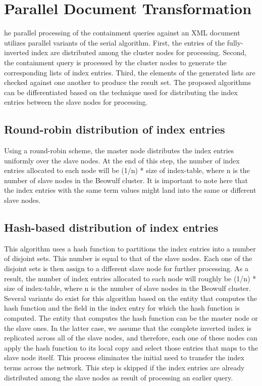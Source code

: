 \section{Parallel Document Transformation}
he parallel processing of the containment queries against an XML document utilizes parallel variants of the serial algorithm. First, the entries of the fully-inverted index are distributed among the cluster nodes for processing. Second, the containment query is processed by the cluster nodes to generate the corresponding lists of index entries. Third, the elements of the generated lists are checked against one another to produce the result set. The proposed algorithms can be differentiated based on the technique used for distributing the index entries between the slave nodes for processing.
\subsection{Round-robin distribution of index entries}
Using a round-robin scheme, the master node distributes the index entries uniformly over the slave nodes. At the end of this step, the number of index entries allocated to each node will be (1/n) * size of index-table, where n is the number of slave nodes in the Beowulf cluster. It is important to note here that the index entries with the same term values might land 
into the same or different slave nodes.
\subsection{Hash-based distribution of index entries}
This algorithm uses a hash function to partitions the index entries into a number of disjoint sets. This number is equal to that of the slave nodes. Each one of the disjoint sets is then assign to a different slave node for further processing. As a result, the number of index entries allocated to each node will roughly be (1/n) * size of index-table, where n is the number of slave nodes in the Beowulf cluster. Several variants do exist for this algorithm based on the entity that computes the hash function and the field in the index entry for which the hash function is computed. The entity that computes the hash function can be the master node or the slave ones. In the latter case, we assume that the complete inverted index is replicated across all of the slave nodes, and therefore, each one of these nodes can apply the hash function to its local copy and select those entries that maps to the slave node itself. This process eliminates the initial need to transfer the index terms across the network. This step is skipped if the index entries are already distributed among the slave nodes as result of processing an earlier query.
\subsection{}
